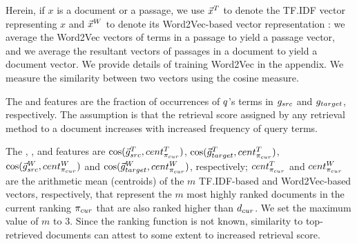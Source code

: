 Herein, if $x$ is a document or a passage, we use
$\vec{x}^{T}$ to denote the TF.IDF vector representing $x$ and
$\vec{x}^{W}$ to denote its Word2Vec-based vector representation \cite{Mikolov+al:13a}: we average
the Word2Vec vectors of terms in a passage to yield a passage vector,
and we average the resultant vectors of passages in a document to yield a document
vector. We provide details of training Word2Vec in the appendix. We measure the similarity between two
vectors using the cosine measure.



The \qryTermSrc and \qryTermTarget features are the fraction of
occurrences of $q$'s terms in $g_{src}$ and $g_{target}$,
respectively. The assumption is that the retrieval score assigned by
any retrieval method to a document increases with increased frequency of query terms. 

The {\simSrcTopTF}, {\simTargetTopTF}, {\simSrcTopWtV} and
{\simTargetTopWtV} features are
$\cos(\vec{g}^{T}_{src},cent^{T}_{\pi_{cur}})$, $\cos(\vec{g}^{T}_{target},cent^{T}_{\pi_{cur}})$,
$\cos(\vec{g}^{W}_{src},cent^{W}_{\pi_{cur}})$ and
$\cos(\vec{g}^{W}_{target},cent^{W}_{\pi_{cur}})$, respectively; $cent^{T}_{\pi_{cur}}$ and
$cent^{W}_{\pi_{cur}}$ are the arithmetic mean (centroids) of the $m$ TF.IDF-based
and Word2Vec-based vectors, respectively, that represent the $m$ most
highly ranked documents in the current ranking $\pi_{cur}$ that are also ranked
higher than $d_{cur}$. We set the maximum value of $m$ to $3$. Since
the ranking function is not known, similarity to top-retrieved
documents can attest to some extent to increased retrieval score.

